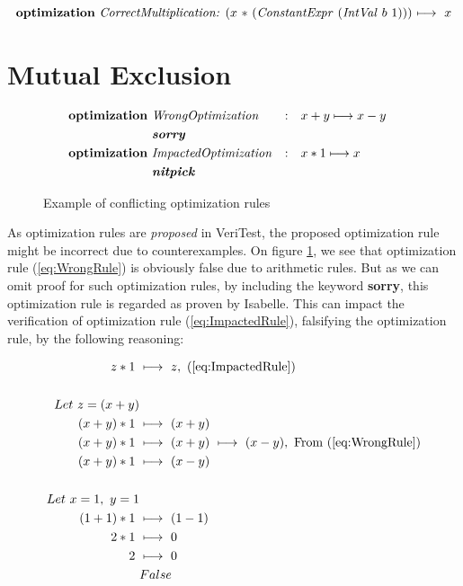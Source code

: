 \begin{equation}
    \text{\textbf{optimization} \emph{CorrectMultiplication:} \((x\ *\) (\emph{ConstantExpr} (\emph{IntVal} \(b\ 1\)))) \(\longmapsto\ x\)}
    \label{eq:CorrectRule}
\end{equation}

\section{Mutual Exclusion}
\label{sec:MutualExclusion}

\begin{figure}[h]
    \begin{alignat}{3}
        \text{\textbf{optimization} } & \text{\emph{WrongOptimization}} & : \quad & \text{\emph{\(x + y \longmapsto x - y\)}} & \label{eq:WrongRule} \\
        & \text{\textbf{\emph{sorry}}} & & & \nonumber \\
        \text{\textbf{optimization} } & \text{\emph{ImpactedOptimization}} & : \quad & \text{\emph{\(x * 1 \longmapsto x\)}} & \label{eq:ImpactedRule} \\
        & \text{\textbf{\emph{nitpick}}} & & & \nonumber
    \end{alignat}

    \caption{Example of conflicting optimization rules}
    \label{fig:conflictingRules}
\end{figure}

As optimization rules are \emph{proposed} in VeriTest, the proposed optimization rule might be incorrect due to counterexamples. On figure 
\ref{fig:conflictingRules}, we see that optimization rule (\ref{eq:WrongRule}) is obviously false due to arithmetic rules. But as we can omit 
proof for such optimization rules, by including the keyword \textbf{sorry}, this optimization rule is regarded as proven by Isabelle. This can 
impact the verification of optimization rule (\ref{eq:ImpactedRule}), falsifying the optimization rule, by the following reasoning:

\begin{align}
    z * 1\ &\longmapsto\ z,\ \text{(\ref{eq:ImpactedRule})} \\
    \nonumber \\
    Let\ z = (x + y) \\
    (x + y) * 1\ &\longmapsto\ (x + y) \\
    (x + y) * 1\ &\longmapsto\ (x + y)\ \longmapsto\ (x - y),\ \text{From (\ref{eq:WrongRule})} \\
    (x + y) * 1\ &\longmapsto\ (x - y) \\
    \nonumber \\
    Let\ x = 1,\ y = 1 \\
    (1 + 1) * 1\ &\longmapsto\ (1 - 1) \\
    2 * 1\ &\longmapsto\ 0 \\
    2\ &\longmapsto\ 0 \\
    &False
\end{align}

